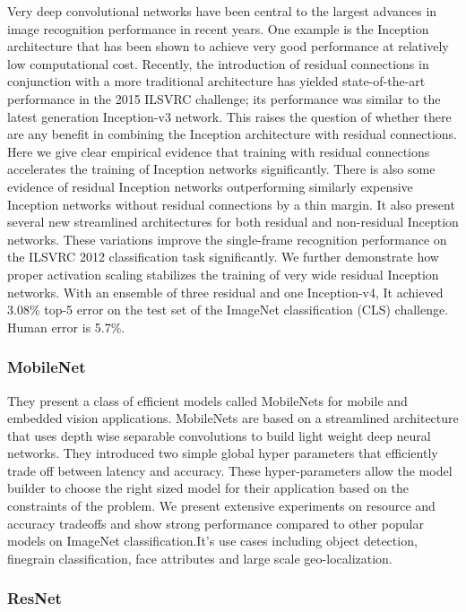 \documentclass[12pt]{article}
\begin{document}
       Very deep convolutional networks have been central to
the largest advances in image recognition performance in
recent years. One example is the Inception architecture that
has been shown to achieve very good performance at relatively low computational cost.  Recently, the introduction
of residual connections in conjunction with a more traditional architecture has yielded state-of-the-art performance
in the 2015 ILSVRC challenge; its performance was similar
to the latest generation Inception-v3 network.  This raises
the question of whether there are any benefit in combining
the Inception architecture with residual connections.  Here
we give clear empirical evidence that training with residual
connections accelerates the training of Inception networks
significantly. There is also some evidence of residual Inception networks outperforming similarly expensive Inception
networks without residual connections by a thin margin. It
also present several new streamlined architectures for both
residual and non-residual Inception networks. These variations improve the single-frame recognition performance on
the ILSVRC 2012 classification task significantly.  We further demonstrate how proper activation scaling stabilizes
the training of very wide residual Inception networks. With
an  ensemble  of  three  residual  and  one  Inception-v4,  It
achieved 3.08\% top-5 error on the test set of the ImageNet
classification (CLS) challenge. Human error is 5.7\%.
        \subsubsection{MobileNet}

        They present a class of efficient models called MobileNets for mobile and embedded vision applications.  MobileNets are  based  on  a  streamlined  architecture  that  uses  depth wise  separable  convolutions  to  build  light  weight  deep neural  networks.   They  introduced  two  simple  global  hyper parameters  that  efficiently  trade  off  between  latency  and accuracy. These hyper-parameters allow the model builder to choose the right sized model for their application based on  the  constraints  of  the  problem.   We  present  extensive experiments on resource and accuracy tradeoffs and show strong performance compared to other popular models on ImageNet classification.It's use  cases  including  object  detection,  finegrain  classification, face attributes and large scale geo-localization.
        
        \subsubsection{ResNet}
\end{document}
